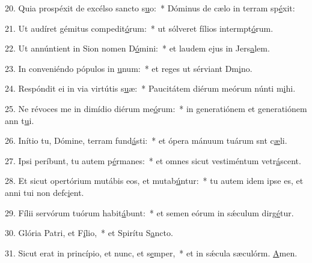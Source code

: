 20. Quia prospéxit de excélso sancto s\uline{u}o:~* Dóminus de cælo in terram sp\uline{é}xit:\par 
21. Ut audíret gémitus compedit\uline{ó}rum:~* ut sólveret fílios intermpt\uline{ó}rum.\par 
22. Ut annúntient in Sion nomen D\uline{ó}mini:~* et laudem ejus in Jers\uline{a}lem.\par 
23. In conveniéndo pópulos in \uline{u}num:~* et reges ut sérviant Dm\uline{i}no.\par 
24. Respóndit ei in via virtútis s\uline{u}æ:~* Paucitátem diérum meórum núnti m\uline{i}hi.\par 
25. Ne révoces me in dimídio diérum me\uline{ó}rum:~* in generatiónem et generatiónem ann t\uline{u}i.\par 
26. Inítio tu, Dómine, terram fund\uline{á}sti:~* et ópera mánuum tuárum snt c\uline{æ}li.\par 
27. Ipsi períbunt, tu autem p\uline{é}rmanes:~* et omnes sicut vestiméntum vetr\uline{á}scent.\par 
28. Et sicut opertórium mutábis eos, et mutab\uline{ú}ntur:~* tu autem idem ipse es, et anni tui non defc\uline{i}ent.\par 
29. Fílii servórum tuórum habit\uline{á}bunt:~* et semen eórum in sǽculum dirg\uline{é}tur.\par 
30. Glória Patri, et F\uline{í}lio,~* et Spirítu S\uline{a}ncto.\par 
31. Sicut erat in princípio, et nunc, et s\uline{e}mper,~* et in sǽcula sæculórm. \uline{A}men.\par 
